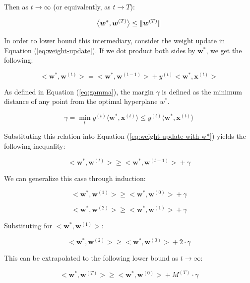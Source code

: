 \documentclass[11pt]{article}
\begin{document}
Then as $t\rightarrow\infty$ (or equivalently, as $t\rightarrow T$):

\begin{equation}
\centering
\big< \boldsymbol{w}^*, \boldsymbol{w}^{(T)} \big> \leq 
\lVert \boldsymbol{w}^{(T)} \rVert
\label{eq:intermediate-upper-bound}    
\end{equation} 

In order to lower bound this intermediary, consider the weight update in Equation (\ref{eq:weight-update}). If we dot product both sides by $\boldsymbol{w}^*$, we get the following:

\begin{equation}
\big< \boldsymbol{w}^*, \boldsymbol{w}^{(t)} \big> = \big< \boldsymbol{w}^*, \boldsymbol{w}^{(t-1)} \big>
+ y^{(t)} \big<\boldsymbol{w}^*,\boldsymbol{x}^{(t)}\big>
\label{eq:weight-update-with-w*}    
\end{equation}

As defined in Equation (\ref{eq:gamma}), the margin $\gamma$ is defined as the minimum distance of any point from the optimal hyperplane $w^*$.

$$\gamma = \min_{t}y^{(t)}\langle\boldsymbol{w}^*,\boldsymbol{x}^{(t)}\rangle \leq y^{(t)}\langle\boldsymbol{w}^*,\boldsymbol{x}^{(t)}\rangle$$

Substituting this relation into Equation (\ref{eq:weight-update-with-w*}) yields the following inequality:

$$\big< \boldsymbol{w}^*, \boldsymbol{w}^{(t)} \big>
\geq
\big< \boldsymbol{w}^*, \boldsymbol{w}^{(t-1)} \big> + \gamma$$

We can generalize this case through induction:

$$\big< \boldsymbol{w}^*, \boldsymbol{w}^{(1)} \big>
\geq
\big< \boldsymbol{w}^*, \boldsymbol{w}^{(0)} \big> + \gamma$$

$$
\big< \boldsymbol{w}^*, \boldsymbol{w}^{(2)} \big>
\geq
\big< \boldsymbol{w}^*, \boldsymbol{w}^{(1)} \big> +
\gamma
$$

Substituting for $\big< \boldsymbol{w}^*, \boldsymbol{w}^{(1)} \big>$:

$$
\big< \boldsymbol{w}^*, \boldsymbol{w}^{(2)} \big>
\geq
\big< \boldsymbol{w}^*, \boldsymbol{w}^{(0)} \big> + 2 \cdot \gamma
$$

This can be extrapolated to the following lower bound as $t \rightarrow \infty$: 

$$
\big< \boldsymbol{w}^*, \boldsymbol{w}^{(T)} \big>
\geq
\big< \boldsymbol{w}^*, \boldsymbol{w}^{(0)} \big> + M^{(T)} \cdot \gamma
$$
\end{document}
